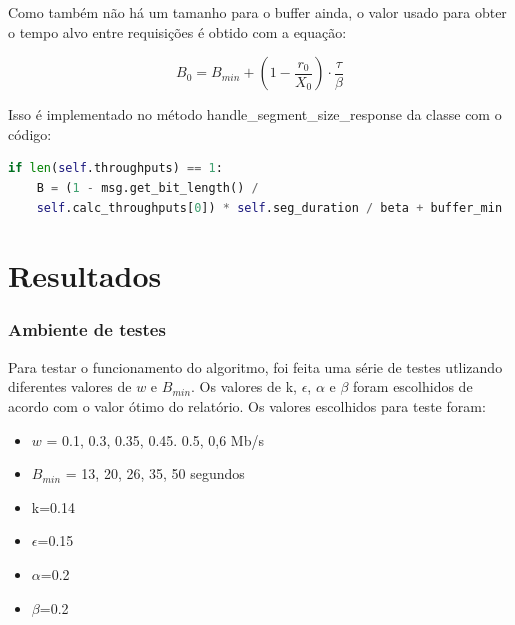 \documentclass[10pt,twocolumn,letterpaper]{article}
\begin{document}
Como também não há um tamanho para o buffer ainda, o valor usado para obter o tempo alvo entre requisições é obtido com a equação:

\begin{equation}
	B_0 = B_{min} + (1 - \frac{r_0}{X_0}) \cdot \frac{\tau}{\beta}
\end{equation}

Isso é implementado no método handle\_segment\_size\_response da classe com o código:

\begin{lstlisting}[language=python]
	if len(self.throughputs) == 1:
	B = (1 - msg.get_bit_length() /
	self.calc_throughputs[0]) * self.seg_duration / beta + buffer_min
	\end{lstlisting}
	\section{Resultados}
	\subsubsection{Ambiente de testes}
	Para testar o funcionamento do algoritmo, foi feita uma série de testes utlizando diferentes valores de $w$ e $B_{min}$. Os valores de k, $\epsilon$, $\alpha$ e $\beta$ foram escolhidos de acordo com o valor ótimo do relatório. Os valores escolhidos para teste foram: 
	\begin{itemize}
		\item $w$ = 0.1, 0.3, 0.35, 0.45. 0.5, 0,6 Mb/s
		\item $B_{min}$  = 13, 20, 26, 35, 50 segundos
		\item k=0.14 
		\item $\epsilon$=0.15 
		\item $\alpha$=0.2
		\item $\beta$=0.2
	\end{itemize}
\end{document}
